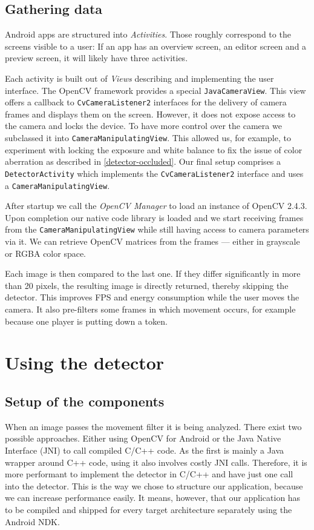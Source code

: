 	\subsection{Gathering data}
	\label{android-framework-gathering}
	Android apps are structured into \textit{Activities}. Those roughly correspond to the screens visible to a user: If an app has an overview screen, an editor screen and a preview screen, it will likely have three activities.

	Each activity is built out of \textit{Views} describing and implementing the user interface. The OpenCV framework provides a special \texttt{JavaCameraView}. This view offers a callback to \texttt{CvCameraListener2} interfaces for the delivery of camera frames and displays them on the screen. However, it does not expose access to the camera and locks the device. To have more control over the camera we subclassed it into \texttt{CameraManipulatingView}. This allowed us, for example, to experiment with locking the exposure and white balance to fix the issue of color aberration as described in \autoref{detector-occluded}. Our final setup comprises a \texttt{DetectorActivity} which implements the \texttt{CvCameraListener2} interface and uses a \texttt{CameraManipulatingView}.

	After startup we call the \textit{OpenCV Manager} to load an instance of OpenCV 2.4.3. Upon completion our native code library is loaded and we start receiving frames from the \texttt{CameraManipulatingView} while still having access to camera parameters via it. We can retrieve OpenCV matrices from the frames --- either in grayscale or RGBA color space.

	Each image is then compared to the last one. If they differ significantly in more than 20 pixels, the resulting image is directly returned, thereby skipping the detector. This improves FPS and energy consumption while the user moves the camera. It also pre-filters some frames in which movement occurs, for example because one player is putting down a token.

	\section{Using the detector}
	\label{android-detector}
	\subsection{Setup of the components}
	\label{android-detector-setup}
	When an image passes the movement filter it is being analyzed. There exist two possible approaches. Either using OpenCV for Android or the Java Native Interface (JNI) to call compiled C/C++ code. As the first is mainly a Java wrapper around C++ code, using it also involves costly JNI calls. Therefore, it is more performant to implement the detector in C/C++ and have just one call into the detector. This is the way we chose to structure our application, because we can increase performance easily. It means, however, that our application has to be compiled and shipped for every target architecture separately using the Android NDK.

